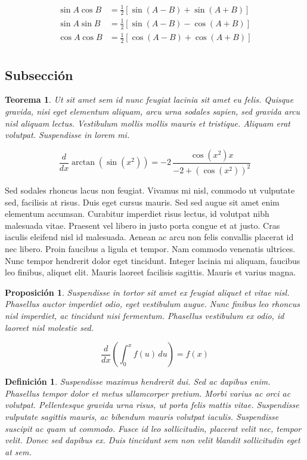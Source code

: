 \documentclass[10pt, a4paper]{article}
\makeatletter
\renewenvironment{proof}[1][\proofname] {\par\pushQED{\qed}\normalfont\topsep6\p@\@plus6\p@\relax\trivlist\item[\hskip\labelsep\itshape\sffamily#1\@addpunct{.}]\ignorespaces}{\popQED\endtrivlist\@endpefalse}
\theoremstyle{theorem-style}
\newtheorem{nth}{Teorema}[section]
\newtheorem{nprop}{Proposición}[section]
\theoremstyle{definition-style}
\newtheorem{ndef}{Definición}[section]
\theoremstyle{remark-style}
\theoremstyle{example-style}
\theoremstyle{definition-style}
\theoremstyle{remark-style}
\makeatother
\begin{document}
\begin{align*}
          \sin A \cos B &= \frac{1}{2}\left[ \sin(A-B)+\sin(A+B) \right] \\
          \sin A \sin B &= \frac{1}{2}\left[ \sin(A-B)-\cos(A+B) \right] \\
          \cos A \cos B &= \frac{1}{2}\left[ \cos(A-B)+\cos(A+B) \right] \\
\end{align*}

\subsection{Subsección}

\begin{nth}
  Ut sit amet sem id nunc feugiat lacinia sit amet eu felis. Quisque gravida, nisi eget elementum aliquam, arcu urna sodales sapien, sed gravida arcu nisl aliquam lectus. Vestibulum mollis mollis mauris et tristique. Aliquam erat volutpat. Suspendisse in lorem mi.

  $${\frac {d}{dx}}\arctan(\sin({x}^{2}))=-2\,{\frac {\cos({x}^{2})x}{-2+ \left (\cos({x}^{2})\right )^{2}}}$$
\end{nth}

\begin{proof}
  Sed sodales rhoncus lacus non feugiat. Vivamus mi nisl, commodo ut vulputate sed, facilisis at risus. Duis eget cursus mauris. Sed sed augue sit amet enim elementum accumsan. Curabitur imperdiet risus lectus, id volutpat nibh malesuada vitae. Praesent vel libero in justo porta congue et at justo. Cras iaculis eleifend nisl id malesuada. Aenean ac arcu non felis convallis placerat id nec libero. Proin faucibus a ligula et tempor. Nam commodo venenatis ultrices. Nunc tempor hendrerit dolor eget tincidunt. Integer lacinia mi aliquam, faucibus leo finibus, aliquet elit. Mauris laoreet facilisis sagittis. Mauris et varius magna.
\end{proof}

\begin{nprop}
  Suspendisse in tortor sit amet ex feugiat aliquet et vitae nisl. Phasellus auctor imperdiet odio, eget vestibulum augue. Nunc finibus leo rhoncus nisl imperdiet, ac tincidunt nisi fermentum. Phasellus vestibulum ex odio, id laoreet nisl molestie sed.

  $$\frac{d}{dx}\left( \int_{0}^{x} f(u)\,du\right)=f(x)$$
\end{nprop}

\begin{ndef}
  Suspendisse maximus hendrerit dui. Sed ac dapibus enim. Phasellus tempor dolor et metus ullamcorper pretium. Morbi varius ac orci ac volutpat. Pellentesque gravida urna risus, ut porta felis mattis vitae. Suspendisse vulputate sagittis mauris, ac bibendum mauris volutpat iaculis. Suspendisse suscipit ac quam ut commodo. Fusce id leo sollicitudin, placerat velit nec, tempor velit. Donec sed dapibus ex. Duis tincidunt sem non velit blandit sollicitudin eget at sem.
\end{ndef}
\end{document}
